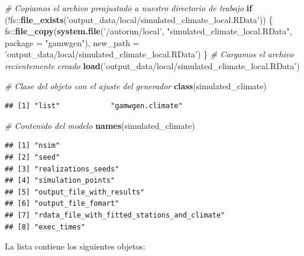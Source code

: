 \documentclass[
]{article}
\newenvironment{Shaded}{}{}
\newcommand{\CommentTok}[1]{\textcolor[rgb]{0.38,0.63,0.69}{\textit{#1}}}
\newcommand{\ControlFlowTok}[1]{\textcolor[rgb]{0.00,0.44,0.13}{\textbf{#1}}}
\newcommand{\DataTypeTok}[1]{\textcolor[rgb]{0.56,0.13,0.00}{#1}}
\newcommand{\KeywordTok}[1]{\textcolor[rgb]{0.00,0.44,0.13}{\textbf{#1}}}
\newcommand{\NormalTok}[1]{#1}
\newcommand{\OperatorTok}[1]{\textcolor[rgb]{0.40,0.40,0.40}{#1}}
\newcommand{\StringTok}[1]{\textcolor[rgb]{0.25,0.44,0.63}{#1}}
\begin{document}
\begin{Shaded}
\begin{Highlighting}[]
\CommentTok{# Copiamos el archivo preajustado a nuestro directorio de trabajo}
\ControlFlowTok{if}\NormalTok{ (}\OperatorTok{!}\NormalTok{fs}\OperatorTok{::}\KeywordTok{file_exists}\NormalTok{(}\StringTok{'output_data/local/simulated_climate_local.RData'}\NormalTok{)) \{}
\NormalTok{  fs}\OperatorTok{::}\KeywordTok{file_copy}\NormalTok{(}\KeywordTok{system.file}\NormalTok{(}\StringTok{'/autorun/local'}\NormalTok{, }\StringTok{"simulated_climate_local.RData"}\NormalTok{,  }\DataTypeTok{package =} \StringTok{"gamwgen"}\NormalTok{),}
              \DataTypeTok{new_path =} \StringTok{'output_data/local/simulated_climate_local.RData'}\NormalTok{)}
\NormalTok{\}  }
\CommentTok{# Cargamos el archivo recientemente creado}
\KeywordTok{load}\NormalTok{(}\StringTok{'output_data/local/simulated_climate_local.RData'}\NormalTok{)}

\CommentTok{# Clase del objeto con el ajuste del generador}
\KeywordTok{class}\NormalTok{(simulated_climate)}
\end{Highlighting}
\end{Shaded}

\begin{verbatim}
## [1] "list"            "gamwgen.climate"
\end{verbatim}

\begin{Shaded}
\begin{Highlighting}[]
\CommentTok{# Contenido del modelo }
\KeywordTok{names}\NormalTok{(simulated_climate)}
\end{Highlighting}
\end{Shaded}

\begin{verbatim}
## [1] "nsim"                                       
## [2] "seed"                                       
## [3] "realizations_seeds"                         
## [4] "simulation_points"                          
## [5] "output_file_with_results"                   
## [6] "output_file_fomart"                         
## [7] "rdata_file_with_fitted_stations_and_climate"
## [8] "exec_times"
\end{verbatim}

La lista contiene los siguientes objetos:
\end{document}
